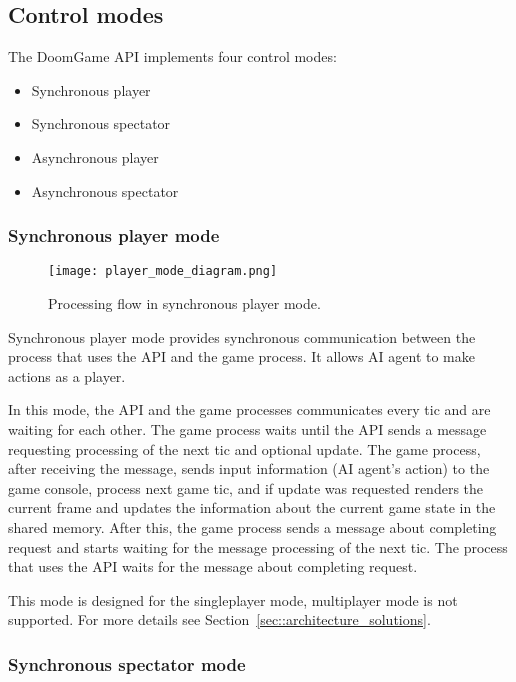 \subsection{Control modes}\label{sec:architecture_modes}

The DoomGame API implements four control modes:
    
    \begin{itemize}
    \item Synchronous player
    \item Synchronous spectator
    \item Asynchronous player
    \item Asynchronous spectator
    \end{itemize}
    
    \subsubsection{Synchronous player mode}\label{sec:architecture_player_mode}
    
        \begin{figure}
			    \centering
			    \texttt{[image: player\_mode\_diagram.png]}
			    \caption{Processing flow in synchronous player mode.}\label{fig:player_mode_diagram}
	    \end{figure}
        
	    Synchronous player mode provides synchronous communication between the process that uses the API and the game process. It allows AI agent to make actions as a player. 
	    
	    In this mode, the API and the game processes communicates every tic and are waiting for each other. The game process waits until the API sends a message requesting processing of the next tic and optional update. The game process, after receiving the message, sends input information (AI agent's action) to the game console, process next game tic, and if update was requested renders the current frame and updates the information about the current game state in the shared memory. After this, the game process sends a message about completing request and starts waiting for the message processing of the next tic. The process that uses the API waits for the message about completing request.
	    
	    This mode is designed for the singleplayer mode, multiplayer mode is not supported. For more details see Section~\ref{sec::architecture_solutions}.

    \subsubsection{Synchronous spectator mode}\label{sec:architecture_spectator_mode}

